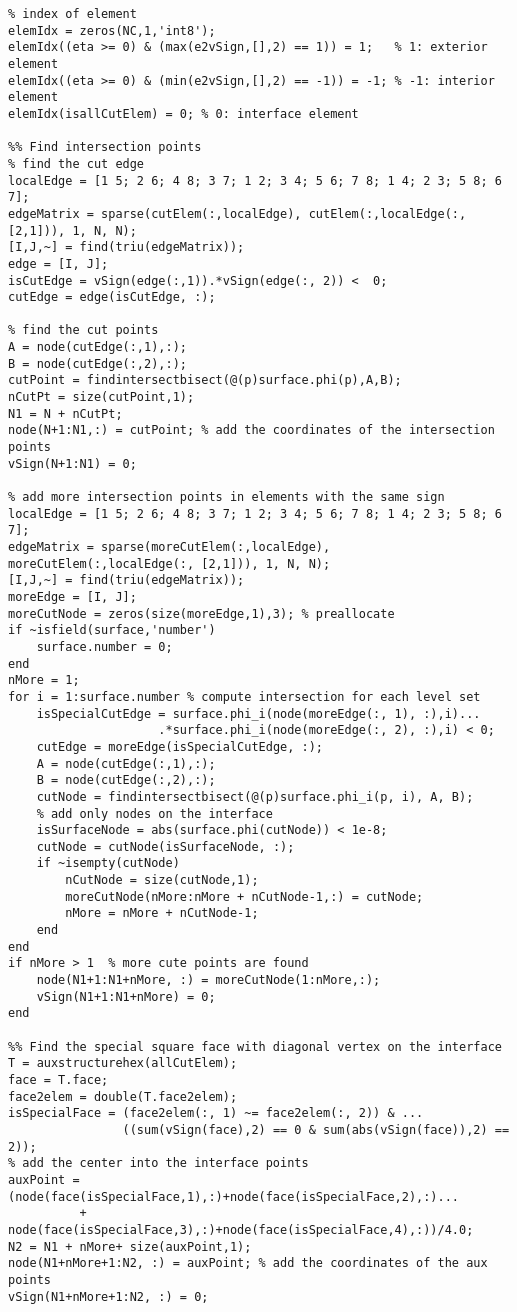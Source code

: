 \documentclass[12pt]{article}
\begin{document}
\begin{lstlisting}
% index of element
elemIdx = zeros(NC,1,'int8');
elemIdx((eta >= 0) & (max(e2vSign,[],2) == 1)) = 1;   % 1: exterior element
elemIdx((eta >= 0) & (min(e2vSign,[],2) == -1)) = -1; % -1: interior element
elemIdx(isallCutElem) = 0; % 0: interface element

%% Find intersection points
% find the cut edge
localEdge = [1 5; 2 6; 4 8; 3 7; 1 2; 3 4; 5 6; 7 8; 1 4; 2 3; 5 8; 6 7];
edgeMatrix = sparse(cutElem(:,localEdge), cutElem(:,localEdge(:,[2,1])), 1, N, N);
[I,J,~] = find(triu(edgeMatrix));
edge = [I, J];
isCutEdge = vSign(edge(:,1)).*vSign(edge(:, 2)) <  0; 
cutEdge = edge(isCutEdge, :);

% find the cut points
A = node(cutEdge(:,1),:);
B = node(cutEdge(:,2),:);
cutPoint = findintersectbisect(@(p)surface.phi(p),A,B);
nCutPt = size(cutPoint,1); 
N1 = N + nCutPt;
node(N+1:N1,:) = cutPoint; % add the coordinates of the intersection points
vSign(N+1:N1) = 0;

% add more intersection points in elements with the same sign
localEdge = [1 5; 2 6; 4 8; 3 7; 1 2; 3 4; 5 6; 7 8; 1 4; 2 3; 5 8; 6 7];
edgeMatrix = sparse(moreCutElem(:,localEdge), moreCutElem(:,localEdge(:, [2,1])), 1, N, N);
[I,J,~] = find(triu(edgeMatrix));
moreEdge = [I, J];
moreCutNode = zeros(size(moreEdge,1),3); % preallocate
if ~isfield(surface,'number')
    surface.number = 0;
end
nMore = 1;
for i = 1:surface.number % compute intersection for each level set
    isSpecialCutEdge = surface.phi_i(node(moreEdge(:, 1), :),i)...
                     .*surface.phi_i(node(moreEdge(:, 2), :),i) < 0;
    cutEdge = moreEdge(isSpecialCutEdge, :);
    A = node(cutEdge(:,1),:);
    B = node(cutEdge(:,2),:);
    cutNode = findintersectbisect(@(p)surface.phi_i(p, i), A, B);
    % add only nodes on the interface
    isSurfaceNode = abs(surface.phi(cutNode)) < 1e-8;
    cutNode = cutNode(isSurfaceNode, :);
    if ~isempty(cutNode)
        nCutNode = size(cutNode,1); 
        moreCutNode(nMore:nMore + nCutNode-1,:) = cutNode;
        nMore = nMore + nCutNode-1;
    end
end
if nMore > 1  % more cute points are found
    node(N1+1:N1+nMore, :) = moreCutNode(1:nMore,:);
    vSign(N1+1:N1+nMore) = 0;
end

%% Find the special square face with diagonal vertex on the interface
T = auxstructurehex(allCutElem);
face = T.face;
face2elem = double(T.face2elem);
isSpecialFace = (face2elem(:, 1) ~= face2elem(:, 2)) & ...
                ((sum(vSign(face),2) == 0 & sum(abs(vSign(face)),2) == 2));
% add the center into the interface points
auxPoint = (node(face(isSpecialFace,1),:)+node(face(isSpecialFace,2),:)...
          + node(face(isSpecialFace,3),:)+node(face(isSpecialFace,4),:))/4.0;
N2 = N1 + nMore+ size(auxPoint,1);
node(N1+nMore+1:N2, :) = auxPoint; % add the coordinates of the aux points
vSign(N1+nMore+1:N2, :) = 0;


\end{lstlisting}
\end{document}
